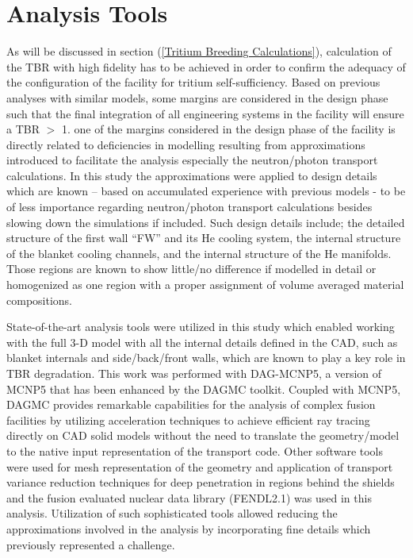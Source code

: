 \documentclass[12pt, letterpaper]{elsarticle}
\begin{document}
\section{Analysis Tools} \label{Analysis Tools}
As will be discussed in section (\ref{Tritium Breeding Calculations}), calculation of the TBR with high fidelity has to be achieved in order to confirm the adequacy of the configuration of the facility for tritium self-sufficiency. Based on previous analyses with similar models, some margins are considered in the design phase such that the final integration of all engineering systems in the facility will ensure a TBR $>$ 1. one of the margins \cite{ref_4} considered in the design phase of the facility is directly related to deficiencies in modelling resulting from approximations introduced to facilitate the analysis especially the neutron/photon transport calculations. In this study the approximations were applied to design details which are known – based on accumulated experience with previous models - to be of less importance regarding neutron/photon transport calculations besides slowing down the simulations if included. Such design details include; the detailed structure of the first wall “FW” and its He cooling system, the internal structure of the blanket cooling channels, and the internal structure of the He manifolds. Those regions are known to show little/no difference if modelled in detail or homogenized as one region with a proper assignment of volume averaged material compositions.\vspace{5mm}

State-of-the-art analysis tools were utilized in this study which enabled working with the full 3-D model with all the internal details defined in the CAD, such as blanket internals and side/back/front walls, which are known to play a key role in TBR degradation. This work was performed with DAG-MCNP5, a version of MCNP5 \cite{ref_5} that has been enhanced by the DAGMC \cite{ref_6} toolkit. Coupled with MCNP5, DAGMC provides remarkable capabilities for the analysis of complex fusion facilities by utilizing acceleration techniques to achieve efficient ray tracing directly on CAD solid models without the need to translate the geometry/model to the native input representation of the transport code. Other software tools were used for mesh representation of the geometry and application of transport variance reduction techniques for deep penetration in regions behind the shields and the fusion evaluated nuclear data library (FENDL2.1)\cite{ref_7} was used in this analysis. Utilization of such sophisticated tools allowed reducing the approximations involved in the analysis by incorporating fine details which previously represented a challenge. 
\end{document}

